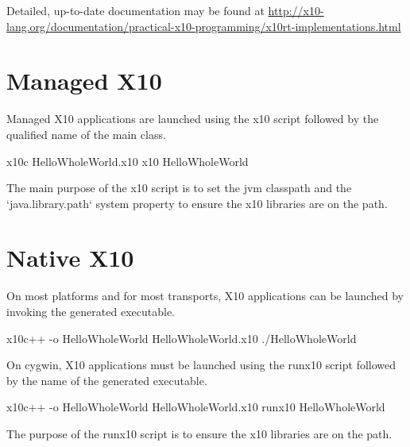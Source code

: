 Detailed, up-to-date documentation may be found at
\url{http://x10-lang.org/documentation/practical-x10-programming/x10rt-implementations.html}


\section{Managed X10}
\label{sect:RunningManaged}


Managed X10 applications are launched using the x10 script followed by the qualified name of the main class.

\begin{xten}
x10c HelloWholeWorld.x10
x10 HelloWholeWorld
\end{xten}

The main purpose of the x10 script is to set the jvm classpath and the
\xcd`java.library.path` system property to ensure the x10 libraries are on the
path.  


\section{Native X10}
\label{sect:RunningNative}

On most platforms and for most transports, X10 applications can be launched by invoking the generated executable.

\begin{xten}
x10c++ -o HelloWholeWorld HelloWholeWorld.x10
./HelloWholeWorld
\end{xten}

On cygwin, X10 applications must be launched using the runx10 script followed by the name of the generated executable.

\begin{xten}
x10c++ -o HelloWholeWorld HelloWholeWorld.x10
runx10 HelloWholeWorld
\end{xten}
The purpose of the runx10 script is to ensure the x10 libraries are on the path. 
